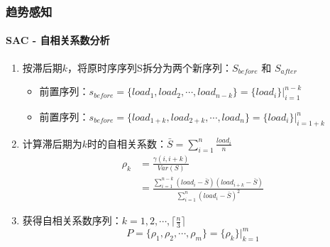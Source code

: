 \begin{frame}
\frametitle{趋势感知}
\framesubtitle{SAC - 自相关系数分析}
\begin{enumerate}[1]
    \item 按滞后期$k$，将原时序序列S拆分为两个新序列：$S_{before}$ 和 $S_{after}$
    \begin{itemize}
        \item 前置序列：$s_{before} = \{load_1,load_2,\cdots,load_{n-k}\}=\{load_i\}|^{n-k}_{i=1}$
        \item 前置序列：$s_{before} = \{load_{1+k},load_{2+k},\cdots,load_{n}\}=\{load_i\}|^{n}_{i=1+k}$
    \end{itemize}
    \item 计算滞后期为$k$时的自相关系数：$\bar{S} = \sum_{i=1}^{n} \frac{load_i}{n}$
    \begin{equation}
    \begin{aligned}
        \rho_k & =  \frac{\gamma(i,i+k)}{Var(S)} \\
               & = \frac{\sum_{i=1}^{n-k} (load_i - \bar{S})(load_{i+k} - \bar{S})}{\sum_{i=1}^{n} (load_i - \bar{S})^2}
    \end{aligned}
    \end{equation}
    \item 获得自相关系数序列：$k=1,2,\cdots,\lceil \frac{n}{3} \rceil$
    \begin{equation}
        P = \{\rho_1,\rho_2,\cdots,\rho_m\} = \{\rho_k\}|^m_{k=1}
    \end{equation}
\end{enumerate}
\bigskip
\end{frame}

